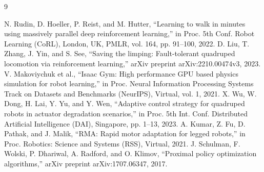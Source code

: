 \begin{thebibliography}{9}
\paperreferencefont
\ifproceedings\else\raggedright\fi
{} N. Rudin, D. Hoeller, P. Reist, and M. Hutter, ``Learning to walk in minutes using massively parallel deep reinforcement learning,'' in Proc. 5th Conf. Robot Learning (CoRL), London, UK, PMLR, vol. 164, pp. 91–100, 2022.
 D. Liu, T. Zhang, J. Yin, and S. See, ``Saving the limping: Fault-tolerant quadruped locomotion via reinforcement learning,'' arXiv preprint arXiv:2210.00474v3, 2023.
 V. Makoviychuk et al., ``Isaac Gym: High performance GPU based physics simulation for robot learning,'' in Proc. Neural Information Processing Systems Track on Datasets and Benchmarks (NeurIPS), Virtual, vol. 1, 2021.
 X. Wu, W. Dong, H. Lai, Y. Yu, and Y. Wen, ``Adaptive control strategy for quadruped robots in actuator degradation scenarios,'' in Proc. 5th Int. Conf. Distributed Artificial Intelligence (DAI), Singapore, pp. 1–13, 2023.
 A. Kumar, Z. Fu, D. Pathak, and J. Malik, ``RMA: Rapid motor adaptation for legged robots,'' in Proc. Robotics: Science and Systems (RSS), Virtual, 2021.
 J. Schulman, F. Wolski, P. Dhariwal, A. Radford, and O. Klimov, ``Proximal policy optimization algorithms,'' arXiv preprint arXiv:1707.06347, 2017.
\end{thebibliography}
